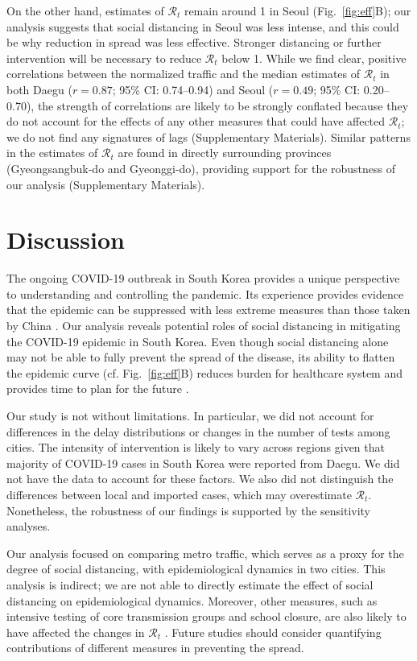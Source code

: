 \documentclass[12pt]{article}
\newcommand{\fref}[1]{Fig.~\ref{fig:#1}}
\begin{document}
On the other hand, estimates of $\mathcal R_t$ remain around 1 in Seoul (\fref{eff}B);
our analysis suggests that social distancing in Seoul was less intense, and this could be why reduction in spread was less effective.
Stronger distancing or further intervention will be necessary to reduce $\mathcal R_t$ below 1.
While we find clear, positive correlations between the normalized traffic and the median estimates of $\mathcal R_t$ in both Daegu ($r=0.87$; 95\% CI: 0.74--0.94) and Seoul ($r=0.49$; 95\% CI: 0.20--0.70), the strength of correlations are likely to be strongly conflated because they do not account for the effects of any other measures that could have affected $\mathcal R_t$;
we do not find any signatures of lags (Supplementary Materials).
Similar patterns in the estimates of $\mathcal R_t$ are found in directly surrounding provinces (Gyeongsangbuk-do and Gyeonggi-do), providing support for the robustness of our analysis (Supplementary Materials).

\section{Discussion}

The ongoing COVID-19 outbreak in South Korea provides a unique perspective to understanding and controlling the pandemic.
Its experience provides evidence that the epidemic can be suppressed with less extreme measures than those taken by China \citep{kickbusch2020response}.
Our analysis reveals potential roles of social distancing in mitigating the COVID-19 epidemic in South Korea.
Even though social distancing alone may not be able to fully prevent the spread of the disease, its ability to flatten the epidemic curve (cf. \fref{eff}B) reduces burden for healthcare system and provides time to plan for the future \citep{anderson2020will}.

Our study is not without limitations.
In particular, we did not account for differences in the delay distributions or changes in the number of tests among cities.
The intensity of intervention is likely to vary across regions given that majority of COVID-19 cases in South Korea were reported from Daegu.
We did not have the data to account for these factors.
We also did not distinguish the differences between local and imported cases, which may overestimate $\mathcal R_t$.
Nonetheless, the robustness of our findings is supported by the sensitivity analyses.

Our analysis focused on comparing metro traffic, which serves as a proxy for the degree of social distancing, with epidemiological dynamics in two cities.
This analysis is indirect; we are not able to directly estimate the effect of social distancing on epidemiological dynamics.
Moreover, other measures, such as intensive testing of core transmission groups and school closure, are also likely to have affected the changes in $\mathcal R_t$ \citep{kcdc}.
Future studies should consider quantifying contributions of different measures in preventing the spread.
\end{document}

